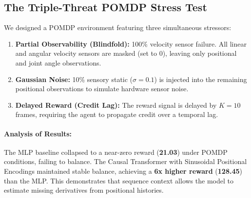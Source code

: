 \documentclass[11pt,a4paper]{article}
\begin{document}
\subsection{The Triple-Threat POMDP Stress Test}
We designed a POMDP environment featuring three simultaneous stressors:
\begin{enumerate}
    \item \textbf{Partial Observability (Blindfold):} 100\% velocity sensor failure. All linear and angular velocity sensors are masked (set to 0), leaving only positional and joint angle observations.
    \item \textbf{Gaussian Noise:} 10\% sensory static ($\sigma=0.1$) is injected into the remaining positional observations to simulate hardware sensor noise.
    \item \textbf{Delayed Reward (Credit Lag):} The reward signal is delayed by $K=10$ frames, requiring the agent to propagate credit over a temporal lag.
\end{enumerate}

\begin{table}[!ht]
    \centering
    \caption{Stressor Ablation Rewards (Mean over 5 Evaluation Runs)}
    \label{tab:pomdp_ablation}
\end{table}

\paragraph{Analysis of Results:}
The MLP baseline collapsed to a near-zero reward (\textbf{21.03}) under POMDP conditions, failing to balance. The Causal Transformer with Sinusoidal Positional Encodings maintained stable balance, achieving a \textbf{6x higher reward} (\textbf{128.45}) than the MLP. This demonstrates that sequence context allows the model to estimate missing derivatives from positional histories.
\end{document}
